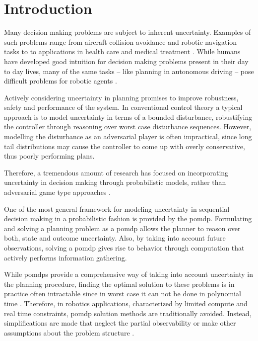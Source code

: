 \chapter{Introduction}\label{chap:introduction}

Many decision making problems are subject to inherent uncertainty. Examples of
such problems range from aircraft collision avoidance and robotic navigation tasks to
to applications in health care and medical treatment
\cite{kochenderfer2012next, schaefer2005modeling}. While humans have
developed good intuition for decision making problems present in their day to
day lives, many of the same tasks -- like planning in autonomous driving --
pose difficult problems for robotic agents \cite{levinson2011towards}.

Actively considering uncertainty in planning promises to improve robustness,
safety and performance of the system. In conventional control theory a typical
approach is to model uncertainty in terms of a bounded disturbance,
robustifying the controller through reasoning over worst case disturbance
sequences. However, modelling the disturbance as an adversarial player is often
impractical, since long tail distributions may cause the controller to come up
with overly conservative, thus poorly performing plans.

Therefore, a tremendous amount of research has focused on incorporating
uncertainty in decision making through probabilistic models, rather than
adversarial game type approaches \cite{roy1999coastal, amato2015planning,
fisac2018probabilistically, choudhury2019dynamic}.

One of the most general framework for modeling uncertainty in sequential
decision making in a probabilistic fashion is provided by the \ac{pomdp}.
Formulating and solving a planning problem as a \ac{pomdp} allows the planner
to reason over both, state and outcome uncertainty. Also, by taking into
account future observations, solving a \ac{pomdp} gives rise to behavior
through computation that actively performs information gathering.

While \acp{pomdp} provide a comprehensive way of taking into account
uncertainty in the planning procedure, finding the optimal solution to these
problems is in practice often intractable since in worst case it can not be
done in polynomial time \cite{papadimitriou1987complexity}. Therefore, in
robotics applications, characterized by limited compute and real time
constraints, \ac{pomdp} solution methods are traditionally avoided. Instead,
simplifications are made that neglect the partial observability or make other
assumptions about the problem structure \cite{sadigh2016information,
fisac2018probabilistically}.

